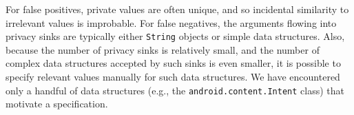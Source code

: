 For false positives, private values are often unique, and so incidental similarity to irrelevant values is improbable. For false negatives, the arguments flowing into privacy sinks are typically either {\tt String} objects or simple data structures. Also, because the number of privacy sinks is relatively small, and the number of complex data structures accepted by such sinks is even smaller, it is possible to specify relevant values manually for such data structures. We have encountered only a handful of data structures (e.g., the \texttt{android.content.Intent} class) that motivate a specification. 



